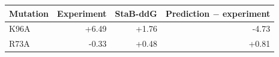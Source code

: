 \begin{tabular}{lrrr}
\toprule
Mutation & Experiment & StaB-ddG & Prediction $-$ experiment \\
\midrule
K96A & +6.49 & +1.76 & -4.73 \\
R73A & -0.33 & +0.48 & +0.81 \\
\bottomrule
\end{tabular}
